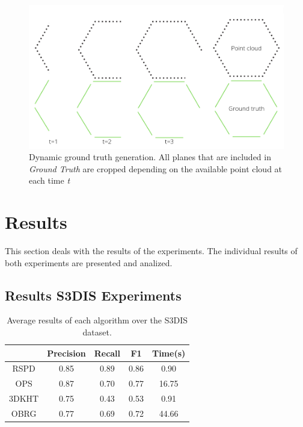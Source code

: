 \documentclass[main.tex]{subfiles}
\begin{document}
\begin{figure}[H]
    \centering
    \includegraphics[width=15 cm]{images/dynamic_eval.png}
    \caption[Dynamic Ground Truth Generation]{Dynamic ground truth generation. All planes that are included in \textit{Ground Truth} are cropped depending on
        the available point cloud at each time \textit{t} }
    \label{fig:dynGT}
\end{figure}

\section{Results}
This section deals with the results of the experiments. The individual results of both experiments are presented and analized.   

\subsection*{Results S3DIS Experiments}

\begin{table}[H]
    \centering
    \begin{tabular}{c|cccc}
              & Precision & Recall & F1   & Time(s)  \\ \hline
        RSPD  & 0.85      & 0.89   & 0.86 & 0.90  \\
        OPS   & 0.87      & 0.70   & 0.77 & 16.75 \\
        3DKHT & 0.75      & 0.43   & 0.53 & 0.91  \\
        OBRG  & 0.77      & 0.69   & 0.72 & 44.66
    \end{tabular}
    \caption[Overall S3DIS Results]{Average results of each algorithm over the S3DIS dataset.}
    \label{tab:algo-acc}
\end{table}
\end{document}
